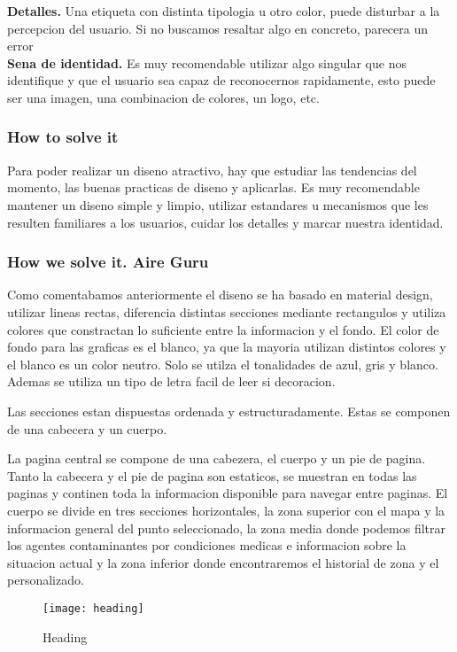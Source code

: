 \textbf{Detalles.} Una etiqueta con distinta tipologia u otro color, puede disturbar a la percepcion del usuario. Si no 
buscamos resaltar algo en concreto, parecera un error \\

\textbf{Sena de identidad.} Es muy recomendable utilizar algo singular que nos identifique y que el usuario sea capaz 
de reconocernos rapidamente, esto puede ser una imagen, una combinacion de colores, un logo, etc.

\subsubsection{How to solve it} 
Para poder realizar un diseno atractivo, hay que estudiar las tendencias del momento, las buenas practicas de diseno y aplicarlas.
Es muy recomendable mantener un diseno simple y limpio, utilizar estandares u mecanismos que les resulten familiares a los usuarios,
cuidar los detalles y marcar nuestra identidad.


\subsubsection{How we solve it. Aire Guru} 
Como comentabamos anteriormente el diseno se ha basado en material design, utilizar lineas rectas, diferencia
distintas secciones mediante rectangulos y utiliza colores que constractan lo suficiente entre la informacion y el fondo.
El color de fondo para las graficas es el blanco, ya que la mayoria utilizan distintos colores y el blanco es un color 
neutro. Solo se utilza el tonalidades de azul, gris y blanco. Ademas se utiliza un tipo de letra facil de leer si decoracion.

Las secciones estan dispuestas ordenada y estructuradamente. Estas  se componen de una cabecera y un cuerpo. 

La pagina central se compone de una cabezera, el cuerpo y un pie de pagina. Tanto la cabecera y el pie de pagina son estaticos,
se muestran en todas las paginas y continen toda la informacion disponible para navegar entre paginas.
El cuerpo se divide en tres secciones horizontales, la zona superior con el mapa y la informacion general del punto seleccionado,
la zona media donde podemos filtrar los agentes contaminantes por condiciones medicas e informacion sobre la situacion actual y la 
zona inferior donde encontraremos el historial de zona y el personalizado.

\begin{figure}[ht]
    \centering
    \texttt{[image: heading]}
    \caption{Heading}
\end{figure}

